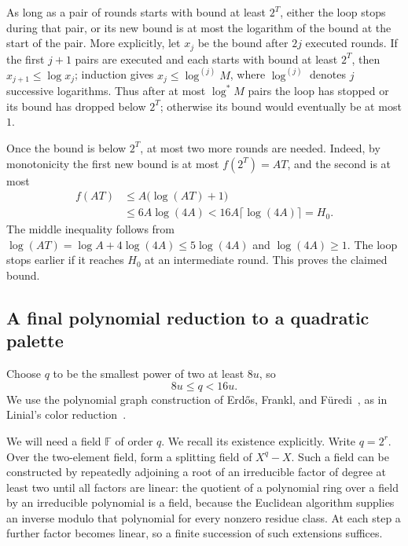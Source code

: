 \documentclass[11pt,a4paper]{article}
\numberwithin{equation}{section}
\newcommand{\logstar}{\log^{*}}
\begin{document}
As long as a pair of rounds starts with bound at least \(2^T\),
either the loop stops during that pair, or its new bound is at
most the logarithm of the bound at the start of the pair.
More explicitly, let \(x_j\) be the bound after \(2j\) executed
rounds. If the first \(j+1\) pairs are executed and each starts
with bound at least \(2^T\), then \(x_{j+1}\leq\log x_j\);
induction gives
\(x_j\leq\log^{(j)}M\), where \(\log^{(j)}\) denotes \(j\)
successive logarithms. Thus after at most \(\logstar M\) pairs
the loop has stopped or its bound has dropped below \(2^T\);
otherwise its bound would eventually be at most \(1\).

Once the bound is below \(2^T\), at most two more rounds are needed.
Indeed, by monotonicity the first new bound is at most
\(f(2^T)=AT\), and the second is at most
\[
\begin{split}
 f(AT)
 &\leq A\bigl(\log(AT)+1\bigr)\\
 &\leq 6A\log(4A)
 <16A\lceil\log(4A)\rceil=H_0.
\end{split}
\]
The middle inequality follows from
\(\log(AT)=\log A+4\log(4A)\leq5\log(4A)\) and
\(\log(4A)\geq1\). The loop stops earlier if it reaches \(H_0\)
at an intermediate round. This proves the claimed bound.

\subsection{A final polynomial reduction to a quadratic palette}

Choose \(q\) to be the smallest power of two at least \(8u\), so
\begin{equation}
 8u\leq q<16u.
 \label{eq:q}
\end{equation}
We use the polynomial graph construction of
Erd\H{o}s, Frankl, and F\"uredi~\cite[Example~3.2]{EFF85},
as in Linial's color reduction~\cite[Lemma~4.2]{Linial92}.

We will need a field \(\mathbb F\) of order \(q\).
We recall its existence explicitly. Write \(q=2^r\).
Over the two-element field, form a splitting field of \(X^q-X\).
Such a field can be constructed by repeatedly adjoining a root of
an irreducible factor of degree at least two until all factors
are linear: the quotient of a polynomial ring over a
field by an irreducible polynomial is a field, because the Euclidean
algorithm supplies an inverse modulo that polynomial for every
nonzero residue class. At each step a further factor becomes linear,
so a finite succession of such extensions suffices.
\end{document}

